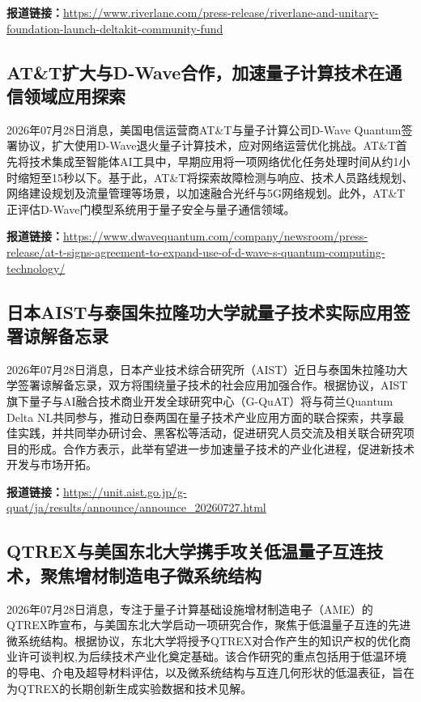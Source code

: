 \documentclass[12pt,a4paper]{ctexart}
\begin{document}
\noindent\textbf{报道链接：}\url{https://www.riverlane.com/press-release/riverlane-and-unitary-foundation-launch-deltakit-community-fund}

\subsection{ AT\&T扩大与D-Wave合作，加速量子计算技术在通信领域应用探索 }

2026年07月28日消息，美国电信运营商AT\&T与量子计算公司D-Wave Quantum签署协议，扩大使用D-Wave退火量子计算技术，应对网络运营优化挑战。AT\&T首先将技术集成至智能体AI工具中，早期应用将一项网络优化任务处理时间从约1小时缩短至15秒以下。基于此，AT\&T将探索故障检测与响应、技术人员路线规划、网络建设规划及流量管理等场景，以加速融合光纤与5G网络规划。此外，AT\&T正评估D-Wave门模型系统用于量子安全与量子通信领域。

\noindent\textbf{报道链接：}\url{https://www.dwavequantum.com/company/newsroom/press-release/at-t-signs-agreement-to-expand-use-of-d-wave-s-quantum-computing-technology/}

\subsection{ 日本AIST与泰国朱拉隆功大学就量子技术实际应用签署谅解备忘录 }

2026年07月28日消息，日本产业技术综合研究所（AIST）近日与泰国朱拉隆功大学签署谅解备忘录，双方将围绕量子技术的社会应用加强合作。根据协议，AIST旗下量子与AI融合技术商业开发全球研究中心（G-QuAT）将与荷兰Quantum Delta NL共同参与，推动日泰两国在量子技术产业应用方面的联合探索，共享最佳实践，并共同举办研讨会、黑客松等活动，促进研究人员交流及相关联合研究项目的形成。合作方表示，此举有望进一步加速量子技术的产业化进程，促进新技术开发与市场开拓。

\noindent\textbf{报道链接：}\url{https://unit.aist.go.jp/g-quat/ja/results/announce/announce\_20260727.html}

\subsection{ QTREX与美国东北大学携手攻关低温量子互连技术，聚焦增材制造电子微系统结构 }

2026年07月28日消息，专注于量子计算基础设施增材制造电子（AME）的QTREX昨宣布，与美国东北大学启动一项研究合作，聚焦于低温量子互连的先进微系统结构。根据协议，东北大学将授予QTREX对合作产生的知识产权的优化商业许可谈判权,为后续技术产业化奠定基础。该合作研究的重点包括用于低温环境的导电、介电及超导材料评估，以及微系统结构与互连几何形状的低温表征，旨在为QTREX的长期创新生成实验数据和技术见解。
\end{document}
